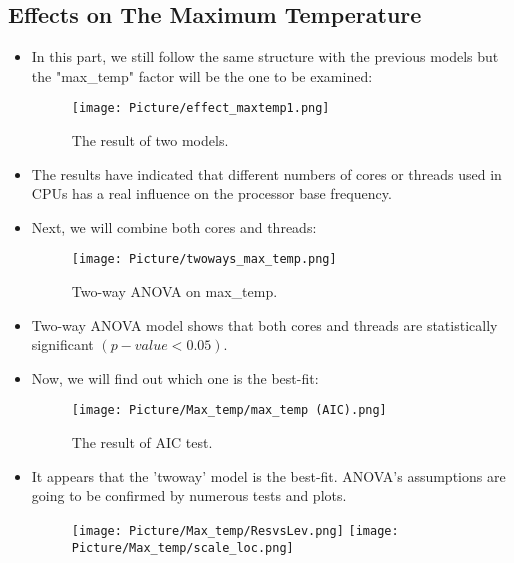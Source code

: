 \documentclass[a4paper]{article}
\begin{document}
\subsection{Effects on The Maximum Temperature}
\begin{itemize}
    \item[] In this part, we still follow the same structure with the previous models but the "max\_temp" factor will be the one to be examined:
 
    \begin{figure}[H]
        \centering
        \texttt{[image: Picture/effect\_maxtemp1.png]}
        \caption{The result of two models.}
    \end{figure}
    
    \item[] The results have indicated that different numbers of cores or threads used in CPUs has a real influence on the processor base frequency.
    
    \item[] Next, we will combine both cores and threads:

    \begin{figure}[H]
        \centering
        \texttt{[image: Picture/twoways\_max\_temp.png]}
        \caption{Two-way ANOVA on max\_temp.}
    \end{figure}
    
    \item[] Two-way ANOVA model shows that both cores and threads are statistically significant $(p-value < 0.05)$.
    
    \item[] Now, we will find out which one is the best-fit:
   
    \begin{figure}[H]
        \centering
        \texttt{[image: Picture/Max\_temp/max\_temp (AIC).png]}
        \caption{The result of AIC test.}
    \end{figure}
    
    \item[] It appears that the 'twoway' model is the best-fit. ANOVA's assumptions are going to be confirmed by numerous tests and plots.
    
    \begin{figure}[H]
        \centering
        \texttt{[image: Picture/Max\_temp/ResvsLev.png]}
        \texttt{[image: Picture/Max\_temp/scale\_loc.png]}
    \end{figure}
    

\end{itemize}
\end{document}

